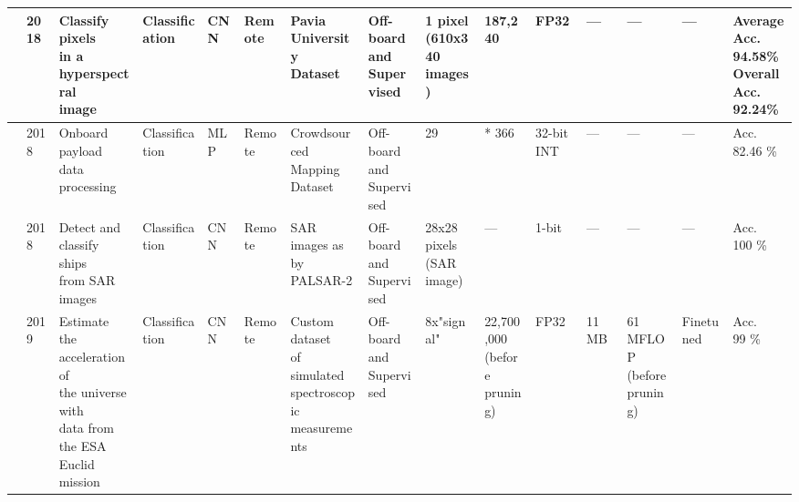 \begin{center}
{\begin{tabular}{lllllllllllllll}
\cite{chenFPGABasedImplementation2018} & 2018 & \makecell[tl]{Classify pixels\\ in a hyperspectral\\ image} & Classification & CNN & Remote & \makecell[tl]{Pavia University\\ Dataset} & \makecell[tl]{Off-board\\ and\\ Supervised} & \makecell[tl]{1 pixel\\ (610x340\\ images)} & 187,240 & FP32 & --- & --- & --- & \makecell[tl]{Average Acc.\\ 94.58\%\\ Overall Acc.\\ 92.24\%}  \\ \hline
\cite{jainExplorationFPGABased2018} & 2018 & \makecell[tl]{Onboard payload\\ data processing} & Classification & MLP & Remote & \makecell[tl]{Crowdsourced\\ Mapping Dataset} & \makecell[tl]{Off-board\\ and\\ Supervised} & 29 & * 366 & 32-bit INT & --- & --- & --- & Acc. 82.46 \% \\ \hline
\cite{hashimotoShipClassificationSAR2018} & 2018 & \makecell[tl]{Detect and\\ classify ships\\ from SAR images} & Classification & CNN & Remote & \makecell[tl]{SAR images as\\ by PALSAR-2} & \makecell[tl]{Off-board\\ and\\ Supervised} & \makecell[tl]{28x28 pixels\\ (SAR image)} & --- & 1-bit & --- & --- & --- & \makecell[tl]{Acc.\\ 100 \%}  \\ \hline
\cite{pitsisEfficientConvolutionalNeural2019} & 2019 & \makecell[tl]{Estimate the\\ acceleration of\\ the universe with\\ data from the ESA\\ Euclid mission} & Classification & CNN & Remote & \makecell[tl]{Custom dataset\\ of simulated\\ spectroscopic\\ measurements} & \makecell[tl]{Off-board\\ and\\ Supervised} & 8x"signal" & \makecell[tl]{22,700,000\\ (before\\ pruning)} & FP32 & 11 MB & \makecell[tl]{61 MFLOP\\ (before\\ pruning)} & Finetuned & \makecell[tl]{Acc.\\ 99 \%}  \\ \hline

\end{tabular}}
\end{center}
